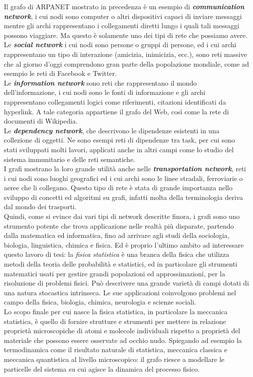 Il grafo di ARPANET mostrato in precedenza è un esempio di \textit{\textbf{communication network}}, i cui nodi sono computer o altri dispositivi capaci di inviare messaggi mentre gli archi rappresentano i collegamenti diretti lungo i quali tali messaggi possono viaggiare. Ma questo è solamente uno dei tipi di rete che possiamo avere.\\
Le \textit{\textbf{social network}} i cui nodi sono persone o gruppi di persone, ed i cui archi rappresentano un tipo di interazione (amicizia, inimicizia, ecc.), sono reti massive che al giorno d'oggi comprendono gran parte della popolazione mondiale, come ad esempio le reti di Facebook e Twitter.\\
Le \textit{\textbf{information network}} sono reti che rappresentano il mondo dell'informazione, i cui nodi sono le fonti di informazione e gli archi rappresentano collegamenti logici come riferimenti, citazioni identificati da hyperlink. A tale categoria appartiene il grafo del Web, così come la rete di documenti di Wikipedia.\\
Le \textit{\textbf{dependency network}}, che descrivono le dipendenze esistenti in una collezione di oggetti. Ne sono esempi reti di dipendenze tra task, per cui sono stati sviluppati molti lavori, applicati anche in altri campi come lo studio del sistema immunitario e delle reti semantiche.\\
I grafi mostrano la loro grande utilità anche nelle \textit{\textbf{transportation network}}, reti i cui nodi sono luoghi geografici ed i cui archi sono le linee stradali, ferroviarie o aeree che li collegano. Questo tipo di rete è stata di grande importanza nello sviluppo di concetti ed algoritmi su grafi, infatti molta della terminologia deriva dal mondo dei trasporti.\\
Quindi, come si evince dai vari tipi di network descritte finora, i grafi sono uno strumento potente che trova applicazione nelle realtà più disparate, partendo dalla matematica ed informatica, fino ad arrivare agli studi della sociologia, biologia, linguistica, chimica e fisica. Ed è proprio l'ultimo ambito ad interessare questo lavoro di tesi: la \textit{fisica statistica} è una branca della fisica che utilizza metodi della teoria delle probabilità e statistici, ed in particolare gli strumenti matematici usati per gestire grandi popolazioni ed approssimazioni, per la risoluzione di problemi fisici. Può descrivere una grande varietà di campi dotati di una natura stocastica intrinseca. Le sue applicazioni coinvolgono problemi nel campo della fisica, biologia, chimica, neurologia e scienze sociali.\\
Lo scopo finale per cui nasce la fisica statistica, in particolare la meccanica statistica, è quello di fornire strutture e strumenti per mettere in relazione proprietà microscopiche di atomi e molecole individuali rispetto a proprietà del materiale che possono essere osservate ad occhio nudo. Spiegando ad esempio la termodinamica come il risultato naturale di statistica, meccanica classica e meccanica quantistica al livello microscopico: il grafo riesce a modellare le particelle del sistema su cui agisce la dinamica del processo fisico.


